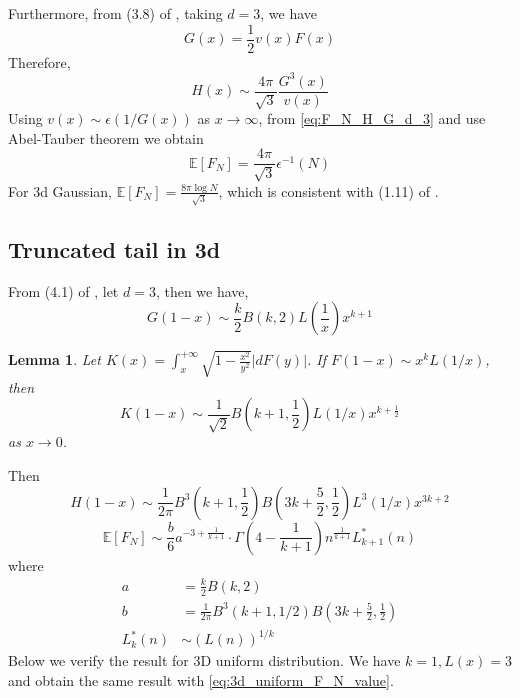 \documentclass{article}
\newtheorem{lemma}{Lemma}
\def\E{\mathbb{E}}
\begin{document}
Furthermore, from (3.8) of \cite{dwyer1991convex}, taking $d=3$, we have
\begin{equation}
    G(x) = \frac{1}{2} v(x)F(x)
\end{equation}
Therefore,
\begin{equation}
    H(x) \sim \frac{4\pi}{\sqrt{3}} \frac{G^3(x)}{v(x)}
\end{equation}
Using $v(x) \sim \epsilon(1/G(x))$ as $x\to \infty$,
from \eqref{eq:F_N_H_G_d_3}
and use Abel-Tauber theorem
\cite{omey1989abelian} we obtain
\begin{equation}
    \E[F_N] = \frac{4\pi}{\sqrt{3}} \epsilon^{-1}(N)
\end{equation}
For 3d Gaussian, $\E[F_N]=\frac{8\pi \log N}{\sqrt{3}}$,
which is consistent with (1.11) of \cite{raynaud1970enveloppe}.
\subsection{Truncated tail in 3d}
From (4.1) of \cite{dwyer1991convex}, let $d=3$, then we have,
\begin{equation}
    G(1-x) \sim \frac{k}{2}B(k,2)L
    \left(\frac{1}{x} \right) x^{k+1}
\end{equation}
\begin{lemma}\label{lem:F_x_sqrt_11_truncated}
    Let $K(x)=\int_x^{+\infty} \sqrt{1-\frac{x^2}{y^2}}
    |d F(y)|$.
    If $F(1-x) \sim x^k L(1/x)$, then
    \begin{equation}
         K(1-x)\sim \frac{1}{\sqrt{2}}
         B(k+1,\frac{1}{2}) L(1/x) x^{k+\frac{1}{2}}
    \end{equation}
    as $x\to 0$.
\end{lemma}
Then
\begin{equation}
    H(1-x) \sim \frac{1}{2\pi}
    B^3(k+1,\frac{1}{2})
    B\left(3k+\frac{5}{2},\frac{1}{2}\right)L^3(1/x)x^{3k+2}
\end{equation}
\begin{equation}
    \E[F_N] \sim \frac{b}{6}
    a^{-3+\frac{1}{k+1}}
    \cdot \Gamma\left(4-\frac{1}{k+1}\right)
    n^{\frac{1}{k+1}} L^*_{k+1}(n)
\end{equation}
where
\begin{align}
a &= \frac{k}{2} B(k,2) \\
b &= \frac{1}{2\pi}B^3(k+1,1/2)
B\left(3k+\frac{5}{2},\frac{1}{2}\right)\\
L^*_k(n) & \sim (L(n))^{1/k}
\end{align}
Below we verify the result for
3D uniform distribution. We have $k=1, L(x)=3$
and obtain the same result with
\eqref{eq:3d_uniform_F_N_value}.
\end{document}
